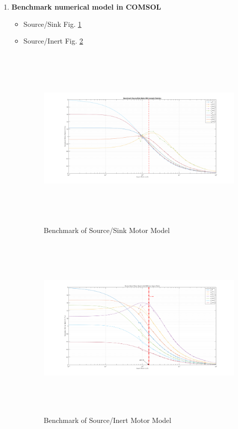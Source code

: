 \documentclass[fontsize=11pt, %
                             paper=a4, %
                             twoside, %
                             captions=tableheading,
                             index=totoc,
                             hyperref]{labbook}
\begin{document}
\begin{addmargin}[4cm]{0cm}
\begin{enumerate}
\item \textbf{Benchmark numerical model in COMSOL}\\
\begin{itemize}
\item Source/Sink Fig. \ref{2016-12-18-BSSMM}
\item Source/Inert Fig. \ref{2016-12-18-BSIMM}
\begin{figure}
\centering
\includegraphics[width=\linewidth, height=3.5in]{2016-12-25-Benchmark_SourceSink_Free.png}
\caption{Benchmark of Source/Sink Motor Model}\label{2016-12-18-BSSMM}
\end{figure}
\begin{figure}
\centering
\includegraphics[width=\linewidth, height=3.5in]{2016-12-18-Benchmark_SourceInert_Free.png}
\caption{Benchmark of Source/Inert Motor Model}\label{2016-12-18-BSIMM}

\end{figure}
\end{itemize}
\end{enumerate}
\end{addmargin}
\end{document}
